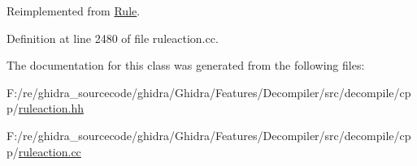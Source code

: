 Reimplemented from \mbox{\hyperlink{class_rule_a4023bfc7825de0ab866790551856d10e}{Rule}}.



Definition at line 2480 of file ruleaction.\+cc.



The documentation for this class was generated from the following files\+:\begin{DoxyCompactItemize}
\item 
F\+:/re/ghidra\+\_\+sourcecode/ghidra/\+Ghidra/\+Features/\+Decompiler/src/decompile/cpp/\mbox{\hyperlink{ruleaction_8hh}{ruleaction.\+hh}}\item 
F\+:/re/ghidra\+\_\+sourcecode/ghidra/\+Ghidra/\+Features/\+Decompiler/src/decompile/cpp/\mbox{\hyperlink{ruleaction_8cc}{ruleaction.\+cc}}\end{DoxyCompactItemize}
